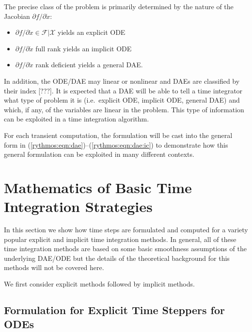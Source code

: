 \documentclass[pdf,ps2pdf,11pt]{SANDreport}
\begin{document}
The precise class of the problem is primarily determined by the nature of the
Jacobian ${}\partial f / {}\partial {}\dot{x}$:
%
\begin{itemize}
%
{}\item ${}\partial f / {}\partial {}\dot{x} {}\in {}\mathcal{F}|\mathcal{X}$ yields an explicit ODE
%
{}\item ${}\partial f / {}\partial {}\dot{x}$ full rank yields an implicit ODE
%
{}\item ${}\partial f / {}\partial {}\dot{x}$ rank deficient yields a general
DAE.
\end{itemize}
%
In addition, the ODE/DAE may linear or nonlinear and DAEs are classified by
their index [???].  It is expected that a DAE will be able to tell a time
integrator what type of problem it is (i.e.\ explicit ODE, implicit ODE,
general DAE) and which, if any, of the variables are linear in the problem.
This type of information can be exploited in a time integration algorithm.

For each transient computation, the formulation will be cast into the general
form in (\ref{rythmos:eqn:dae})--(\ref{rythmos:eqn:dae:ic}) to demonstrate how
this general formulation can be exploited in many different contexts.

\section{Mathematics of Basic Time Integration Strategies}

In this section we show how time steps are formulated and computed for a
variety popular explicit and implicit time integration methods.  In general,
all of these time integration methods are based on some basic smoothness
assumptions of the underlying DAE/ODE but the details of the theoretical
background for this methods will not be covered here.

We first consider explicit methods followed by implicit methods.

\subsection{Formulation for Explicit Time Steppers for ODEs}
\end{document}
